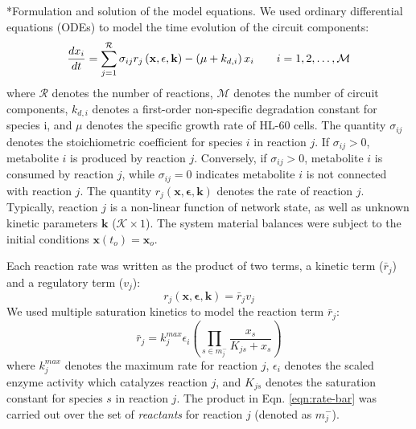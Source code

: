 \documentclass[12pt]{article}
\makeatletter
\renewcommand\subsection{\@startsection
	{subsection}{2}{0mm}
	{-0.05in}
	{-0.5\baselineskip}
	{\normalfont\normalsize\bfseries}}
\makeatother
\begin{document}
\subsection*{Formulation and solution of the model equations.}
We used ordinary differential equations (ODEs) to model the time evolution of the circuit components:
\begin{equation}
	\frac{dx_{i}}{dt}  = \sum_{j = 1}^{\mathcal{R}}\sigma_{ij}r_{j}\left(\mathbf{x},\mathbf{\epsilon},\mathbf{k}\right) - \left(\mu + k_{d,i}\right)x_{i}\qquad{i=1,2,\hdots,\mathcal{M}}\\
\end{equation}where $\mathcal{R}$ denotes the number of reactions, $\mathcal{M}$ denotes the number of circuit components, $k_{d,i}$ denotes a first-order non-specific degradation constant
for species i, and $\mu$ denotes the specific growth rate of HL-60 cells.
The quantity $\sigma_{ij}$ denotes the stoichiometric coefficient for species $i$ in reaction $j$. If 
$\sigma_{ij}>0$, metabolite $i$ is produced by reaction $j$. Conversely, if $\sigma_{ij}>0$, metabolite $i$ is consumed by reaction $j$, while $\sigma_{ij} = 0$ indicates
metabolite $i$ is not connected with reaction $j$. 
The quantity $r_{j}\left(\mathbf{x},\mathbf{\epsilon},\mathbf{k}\right)$ denotes the rate of reaction $j$. 
Typically, reaction $j$ is a non-linear function of network state, as well as unknown kinetic parameters $\mathbf{k}$ ($\mathcal{K}\times{1}$).
The system material balances were subject to the initial conditions $\mathbf{x}\left(t_{o}\right) = \mathbf{x}_{o}$.

Each reaction rate was written as the product of two terms, a kinetic term ($\bar{r}_{j}$) and a regulatory term ($v_{j}$):
\begin{equation}\label{eqn:rate-factor}
	r_{j}\left(\mathbf{x},\mathbf{\epsilon},\mathbf{k}\right) = \bar{r}_{j}v_{j}
\end{equation}We used multiple saturation kinetics to model the reaction term $\bar{r}_{j}$:
\begin{equation}\label{eqn:rate-bar}
	\bar{r}_{j} = k_{j}^{max}\epsilon_{i}\left(\prod_{s\in{m_{j}^{-}}}\frac{x_{s}}{K_{js} + x_{s}}\right)
\end{equation}where $k_{j}^{max}$ denotes the maximum rate for reaction $j$, $\epsilon_{i}$ denotes the scaled enzyme activity which catalyzes reaction $j$, and
$K_{js}$ denotes the saturation constant for species $s$ in reaction $j$. 
The product in Eqn. \eqref{eqn:rate-bar} was carried out over the set of \textit{reactants} for reaction $j$ (denoted as $m_{j}^{-}$).
\end{document}
